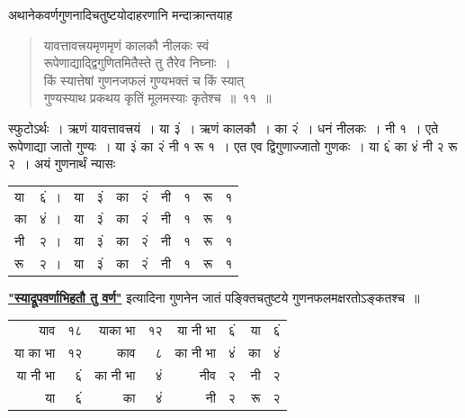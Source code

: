 \documentclass[11pt, openany]{book}
\begin{document}
 अथानेकवर्णगुणनादिचतुष्टयोदाहरणानि मन्दाक्रान्तयाह\textendash  
\begin{quote}
   \ex 
     यावत्तावत्त्रयमृणमृणं कालकौ नीलकः स्वं \\

\vspace{-7mm}
\hspace{1cm} रूपेणाद्याद्द्विगुणितमितैस्ते तु तैरेव निघ्नाः~। \\

 \vspace{-7mm}
 किं स्यात्तेषां गुणनजफलं गुण्यभक्तं च किं स्यात् \\

\vspace{-7mm}
\hspace{1cm} गुण्यस्याथ प्रकथय कृतिं मूलमस्याः कृतेश्च~॥~११~॥

\end{quote}

 स्फुटोऽर्थः~। ऋणं यावत्तावत्त्रयं~। या ३ं~। ऋणं कालकौ~। का २ं~। 
धनं नीलकः~। नी १~। एते रूपेणाद्या जातो गुण्यः~। या ३ं का २ं नी १ 
रू १~। एत एव द्विगुणाज्जातो गुणकः~। या ६ं का ४ं नी २ रू २~। 
अयं गुणनार्थं न्यासः 
\begin{table}[h!]
\centering
\renewcommand{\arraystretch}{1.1}
\begin{tabular}{llllllllll}
      या & ६ं~।& या& ३ं &का &२ं& नी& १& रू& १ \\
 का &४ं~।& या& ३ं &का& २ं &नी& १& रू& १ \\
 नी &२~।& या& ३ं& का& २ं &नी& १& रू& १ \\
 रू &२~।& या& ३ं &का& २ं &नी& १& रू& १ 
\end{tabular}
\end{table}
\vspace{-2mm}

\hyperref[1.8]{\textbf{"स्याद्रूपवर्णाभिहतौ तु वर्ण"}} इत्यादिना गुणनेन जातं पङ्क्तिचतुष्टये गुणनफलमक्षरतोऽङ्कतश्च~॥ 
\begin{table}[h!]
\centering
\renewcommand{\arraystretch}{1.1}
\begin{tabular}{rrrrrrrr}
       याव &१८ &याका भा& १२& या नी भा& ६ं &या& ६ं \\
  या का भा& १२ &काव &८ &का नी भा &४ं& का &४ं \\
  या नी भा& ६ं &का नी भा& ४ं& नीव& २ &नी &२\\
  या& ६ं& का& ४ं &नी &२& रू& २
\end{tabular}
\end{table}
\end{document}
